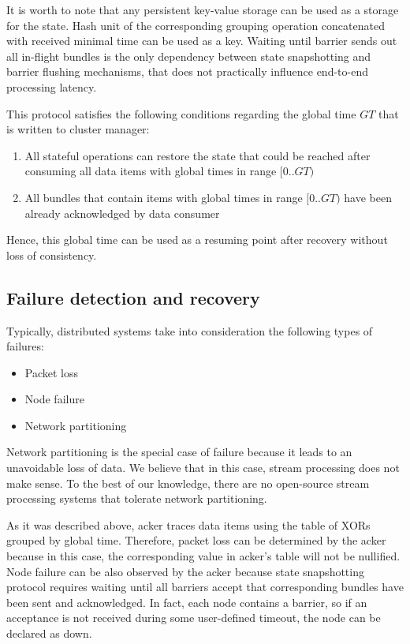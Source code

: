 It is worth to note that any persistent key-value storage can be used as a storage for the state. Hash unit of the corresponding grouping operation concatenated with received minimal time can be used as a key. Waiting until barrier sends out all in-flight bundles is the only dependency between state snapshotting and barrier flushing mechanisms, that does not practically influence end-to-end processing latency. 

This protocol satisfies the following conditions regarding the global time $GT$ that is written to cluster manager:
\begin{enumerate}
    \item All stateful operations can restore the state that could be reached after consuming all data items with global times in range $[0..GT)$ 
    \item All bundles that contain items with global times in range $[0..GT)$ have been already acknowledged by data consumer 
\end{enumerate}

Hence, this global time can be used as a resuming point after recovery without loss of consistency.

\subsection{Failure detection and recovery}
Typically, distributed systems take into consideration the following types of failures:
\begin{itemize}
    \item Packet loss
    \item Node failure
    \item Network partitioning
\end{itemize}

Network partitioning is the special case of failure because it leads to an unavoidable loss of data. We believe that in this case, stream processing does not make sense. To the best of our knowledge, there are no open-source stream processing systems that tolerate network partitioning.

As it was described above, acker traces data items using the table of XORs grouped by global time. Therefore, packet loss can be determined by the acker because in this case, the corresponding value in acker's table will not be nullified. Node failure can be also observed by the acker because state snapshotting protocol requires waiting until all barriers accept that corresponding bundles have been sent and acknowledged. In fact, each node contains a barrier, so if an acceptance is not received during some user-defined timeout, the node can be declared as down. 

